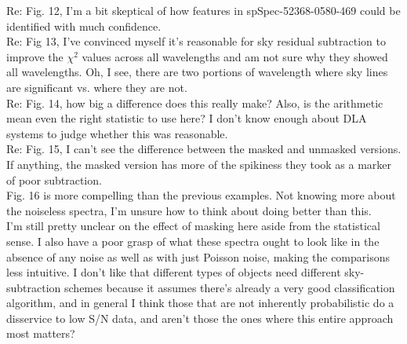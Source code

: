 \documentclass[12pt]{article}
\newcommand{\textul}{\underline}
\begin{document}
Re: Fig. 12, I'm a bit skeptical of how features in spSpec-52368-0580-469 could be identified with much confidence.\\
Re: Fig 13, I've convinced myself it's reasonable for sky residual subtraction to improve the $\chi^{2}$ values across all wavelengths and am not sure why they showed all wavelengths.  Oh, I see, there are two portions of wavelength where sky lines are significant vs. where they are not.\\
Re: Fig. 14, how big a difference does this really make?  Also, is the arithmetic mean even the right statistic to use here?  I don't know enough about DLA systems to judge whether this was reasonable.\\
Re: Fig. 15, I can't see the difference between the masked and unmasked versions.  If anything, the masked version has more of the spikiness they took as a marker of poor subtraction.\\
Fig. 16 is more compelling than the previous examples.  Not knowing more about the noiseless spectra, I'm unsure how to think about doing better than this.\\
I'm still pretty unclear on the effect of masking here aside from the statistical sense.  I also have a poor grasp of what these spectra ought to look like in the absence of any noise as well as with just Poisson noise, making the comparisons less intuitive.  I don't like that different types of objects need different sky-subtraction schemes because it assumes there's already a very good classification algorithm, and in general I think those that are not inherently probabilistic do a disservice to low S/N data, and aren't those the ones where this entire approach most matters?
\end{document}
